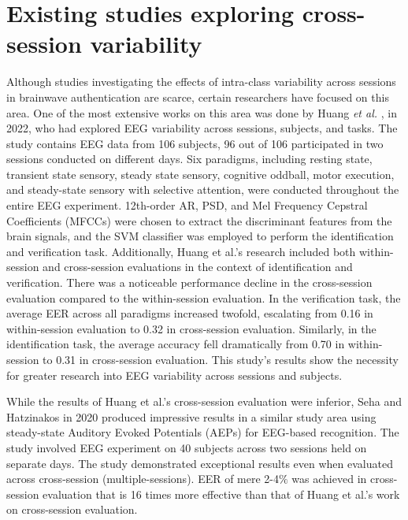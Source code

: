 \section{Existing studies exploring cross-session variability}
\label{sec:Related Work:Existing studies exploring cross-session variability}
Although studies investigating the effects of intra-class variability across sessions in brainwave authentication are scarce, certain researchers have focused on this area. One of the most extensive works on this area was done by Huang \textit{et al.} \cite{huang2022m3cv}, in 2022, who had explored EEG variability across sessions, subjects, and tasks. The study contains EEG data from 106 subjects, 96 out of 106 participated in two sessions conducted on different days. Six paradigms, including resting state, transient state sensory, steady state sensory, cognitive oddball, motor execution, and steady-state sensory with selective attention, were conducted throughout the entire EEG experiment. 12th-order AR, PSD, and Mel Frequency Cepstral Coefficients (MFCCs) were chosen to extract the discriminant features from the brain signals, and the SVM classifier was employed to perform the identification and verification task. Additionally, Huang et al.'s research included both within-session and cross-session evaluations in the context of identification and verification. There was a noticeable performance decline in the cross-session evaluation compared to the within-session evaluation. In the verification task, the average EER across all paradigms increased twofold, escalating from 0.16 in within-session evaluation to 0.32 in cross-session evaluation. Similarly, in the identification task, the average accuracy fell dramatically from 0.70 in within-session to 0.31 in cross-session evaluation. This study's results show the necessity for greater research into EEG variability across sessions and subjects. 
\smallskip 


While the results of Huang et al.'s cross-session evaluation were inferior, Seha and Hatzinakos \cite{seha2020eeg} in 2020 produced impressive results in a similar study area using steady-state Auditory Evoked Potentials (AEPs) for EEG-based recognition. The study involved EEG experiment on 40 subjects across two sessions held on separate days. The study demonstrated exceptional results even when evaluated across cross-session (multiple-sessions). EER of mere 2-4$\%$ was achieved in cross-session evaluation that is 16 times more effective than that of Huang et al.'s work on cross-session evaluation. 

